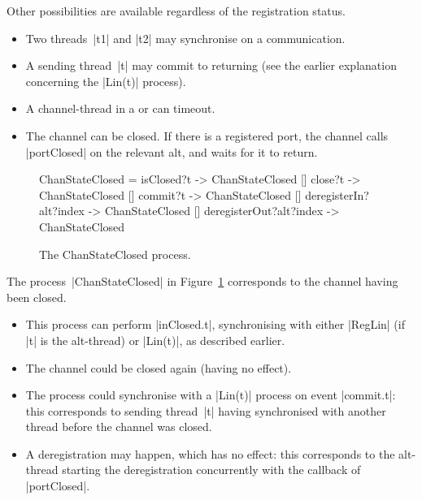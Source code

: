 Other possibilities are available regardless of the registration status.
%
\begin{itemize}
\item Two threads~|t1| and |t2| may synchronise on a communication.

\item A sending thread~|t| may commit to returning (see the earlier
  explanation concerning the |Lin(t)| process). 

\item A channel-thread in a  or  can
  timeout. 

\item The channel can be closed.  If there is a registered port, the channel
  calls |portClosed| on the relevant alt, and waits for it to return.
\end{itemize}


\begin{figure}
\begin{cspm}
ChanStateClosed = 
  isClosed?t -> ChanStateClosed
  [] close?t -> ChanStateClosed
  [] commit?t -> ChanStateClosed
  [] deregisterIn?alt?index -> ChanStateClosed
  [] deregisterOut?alt?index -> ChanStateClosed
\end{cspm}
\caption{The {\scalashape ChanStateClosed}
  process.  \label{fig:ChanStateClosed}}
\end{figure}


The process~|ChanStateClosed| in Figure~\ref{fig:ChanStateClosed} corresponds
to the channel having been closed.  
%
\begin{itemize}
\item This process can perform |inClosed.t|, synchronising with either
  |RegLin| (if |t| is the alt-thread) or |Lin(t)|, as described earlier.

\item The channel could be closed again (having no effect).

\item The process could synchronise with a |Lin(t)| process on event
  |commit.t|: this corresponds to sending thread~|t| having synchronised with
  another thread before the channel was closed. 

\item A deregistration may happen, which has no effect: this corresponds to
  the alt-thread starting the deregistration concurrently with the callback of
  |portClosed|. 
\end{itemize}


